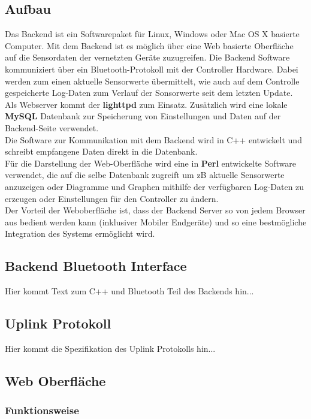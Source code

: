 \documentclass[12pt,a4paper]{article}
\begin{document}
\subsection{Aufbau}

Das Backend ist ein Softwarepaket für Linux, Windows oder Mac OS X basierte Computer. Mit dem Backend ist es möglich über eine Web basierte Oberfläche auf die Sensordaten der vernetzten Geräte zuzugreifen. Die Backend Software kommuniziert über ein Bluetooth-Protokoll mit der Controller Hardware. Dabei werden zum einen aktuelle Sensorwerte übermittelt, wie auch auf dem Controlle gespeicherte Log-Daten zum Verlauf der Sonsorwerte seit dem letzten Update.\\
Als Webserver kommt der {\bf lighttpd} zum Einsatz. Zusätzlich wird eine lokale {\bf MySQL} Datenbank zur Speicherung von Einstellungen und Daten auf der Backend-Seite verwendet.\\
Die Software zur Kommunikation mit dem Backend wird in C++ entwickelt und schreibt empfangene Daten direkt in die Datenbank.\\
Für die Darstellung der Web-Oberfläche wird eine in {\bf Perl} entwickelte Software verwendet, die auf die selbe Datenbank zugreift um zB aktuelle Sensorwerte anzuzeigen oder Diagramme und Graphen mithilfe der verfügbaren Log-Daten zu erzeugen oder Einstellungen für den Controller zu ändern.\\
Der Vorteil der Weboberfläche ist, dass der Backend Server so von jedem Browser aus bedient werden kann (inklusiver Mobiler Endgeräte) und so eine bestmögliche Integration des Systems ermöglicht wird.

\subsection{Backend Bluetooth Interface}

Hier kommt Text zum C++ und Bluetooth Teil des Backends hin...

\subsection{Uplink Protokoll}

Hier kommt die Spezifikation des Uplink Protokolls hin...

\subsection{Web Oberfläche}

\subsubsection{Funktionsweise}
\end{document}
